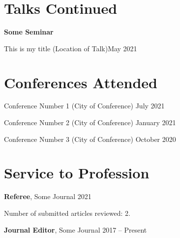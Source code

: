\documentclass[margin,line]{res}
\newenvironment{basiclist}{
  \begin{list}{}{
      \setlength{\itemsep}{0.06in}
      \setlength{\parsep}{0in} 
      \setlength{\parskip}{0in}
      \setlength{\topsep}{0in} 
      \setlength{\partopsep}{0in} 
      \setlength{\rightmargin}{0in}
      \setlength{\leftmargin}{0in}
      }}{\end{list}
  }
\newenvironment{list-talks}{
  \begin{list}{}{
      \setlength{\itemsep}{0.1in}
      \setlength{\parsep}{0in} 
      \setlength{\parskip}{0in}
      \setlength{\topsep}{0in} 
      \setlength{\partopsep}{0in} 
      \setlength{\rightmargin}{0in}
      \setlength{\leftmargin}{0in}
      }}{\end{list}
  }
\newenvironment{bullet-italic-right-stop}{
  \begin{list}{$\bullet$}{
      \setlength{\itemsep}{0.02in}
      \setlength{\parsep}{0in} 
      \setlength{\parskip}{0in}
      \setlength{\topsep}{0in} 
      \setlength{\partopsep}{0.025in} 
      \setlength{\rightmargin}{0.89in}
      \setlength{\leftmargin}{0.3in}
      \itshape
      }}{\end{list}
      \vspace*{-0.05in}
  }
\newenvironment{bullet-italic-no-right-stop}{
  \begin{list}{$\bullet$}{
      \setlength{\itemsep}{0.02in}
      \setlength{\parsep}{0in} 
      \setlength{\parskip}{0in}
      \setlength{\topsep}{0in} 
      \setlength{\partopsep}{0.025in} 
      \setlength{\rightmargin}{0in}
      \setlength{\leftmargin}{0.3in}
      \itshape
      }}{\end{list}
  }
\begin{document}
\begin{resume}

\section{\sc Talks Continued}
\begin{list-talks}

\item \textbf{Some Seminar}  

\begin{bullet-italic-no-right-stop}
\item This is my title (Location of Talk)\hfill{\textnormal{May 2021}}
\end{bullet-italic-no-right-stop}

\end{list-talks}


\section{\sc Conferences Attended}

\begin{basiclist}

\item Conference Number 1 (City of Conference) \hfill{July 2021}
\item Conference Number 2 (City of Conference) \hfill{January 2021}
\item Conference Number 3 (City of Conference) \hfill{October 2020}

\end{basiclist}


\section{\sc Service to Profession}
\begin{basiclist}

\item  \textbf{Referee}, Some Journal \hfill{ 2021}

\begin{bullet-italic-right-stop}
\item Number of submitted articles reviewed: 2.
\end{bullet-italic-right-stop}

\item \textbf{Journal Editor}, Some Journal \hfill{2017 -- Present}


\end{basiclist}
\end{resume}
\end{document}
